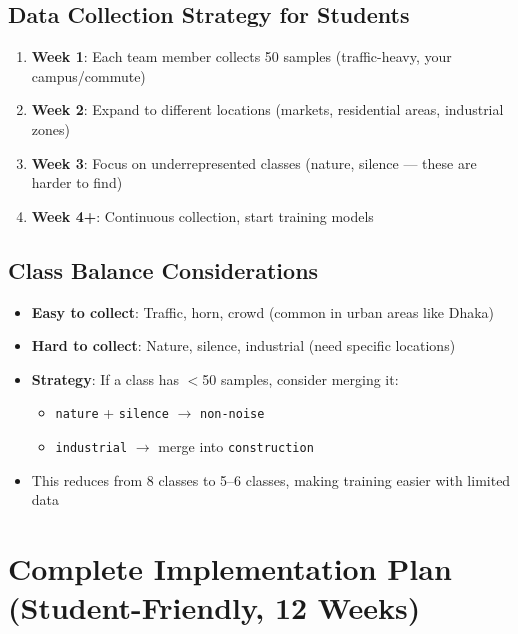 \documentclass[11pt,a4paper]{article}
\begin{document}
\subsection{Data Collection Strategy for Students}

\begin{enumerate}[leftmargin=*,noitemsep]
    \item \textbf{Week 1}: Each team member collects 50 samples (traffic-heavy, your campus/commute)
    \item \textbf{Week 2}: Expand to different locations (markets, residential areas, industrial zones)
    \item \textbf{Week 3}: Focus on underrepresented classes (nature, silence — these are harder to find)
    \item \textbf{Week 4+}: Continuous collection, start training models
\end{enumerate}

\subsection{Class Balance Considerations}

\begin{itemize}[leftmargin=*,noitemsep]
    \item \textbf{Easy to collect}: Traffic, horn, crowd (common in urban areas like Dhaka)
    \item \textbf{Hard to collect}: Nature, silence, industrial (need specific locations)
    \item \textbf{Strategy}: If a class has $<$50 samples, consider merging it:
    \begin{itemize}
        \item \texttt{nature} + \texttt{silence} $\rightarrow$ \texttt{non-noise}
        \item \texttt{industrial} $\rightarrow$ merge into \texttt{construction}
    \end{itemize}
    \item This reduces from 8 classes to 5--6 classes, making training easier with limited data
\end{itemize}

\section{Complete Implementation Plan (Student-Friendly, 12 Weeks)}
\end{document}
